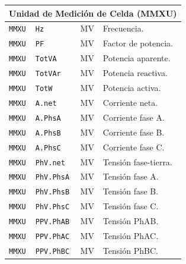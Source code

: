 \begin{longtable}{l l c p{7cm}}
    \multicolumn{4}{c}{\textbf{Unidad de Medición de Celda (MMXU)}} \\ \midrule
    \texttt{MMXU} & \texttt{Hz} & MV & Frecuencia. \\
    \texttt{MMXU} & \texttt{PF} & MV & Factor de potencia. \\
    \texttt{MMXU} & \texttt{TotVA} & MV & Potencia aparente. \\
    \texttt{MMXU} & \texttt{TotVAr} & MV & Potencia reactiva. \\
    \texttt{MMXU} & \texttt{TotW} & MV & Potencia activa. \\
    \texttt{MMXU} & \texttt{A.net} & MV & Corriente neta. \\
    \texttt{MMXU} & \texttt{A.PhsA} & MV & Corriente fase A. \\
    \texttt{MMXU} & \texttt{A.PhsB} & MV & Corriente fase B. \\
    \texttt{MMXU} & \texttt{A.PhsC} & MV & Corriente fase C. \\
    \texttt{MMXU} & \texttt{PhV.net} & MV & Tensión fase-tierra. \\
    \texttt{MMXU} & \texttt{PhV.PhsA} & MV & Tensión fase A. \\
    \texttt{MMXU} & \texttt{PhV.PhsB} & MV & Tensión fase B. \\
    \texttt{MMXU} & \texttt{PhV.PhsC} & MV & Tensión fase C. \\
    \texttt{MMXU} & \texttt{PPV.PhAB} & MV & Tensión PhAB. \\
    \texttt{MMXU} & \texttt{PPV.PhAC} & MV & Tensión PhAC. \\
    \texttt{MMXU} & \texttt{PPV.PhBC} & MV & Tensión PhBC. \\

\end{longtable}